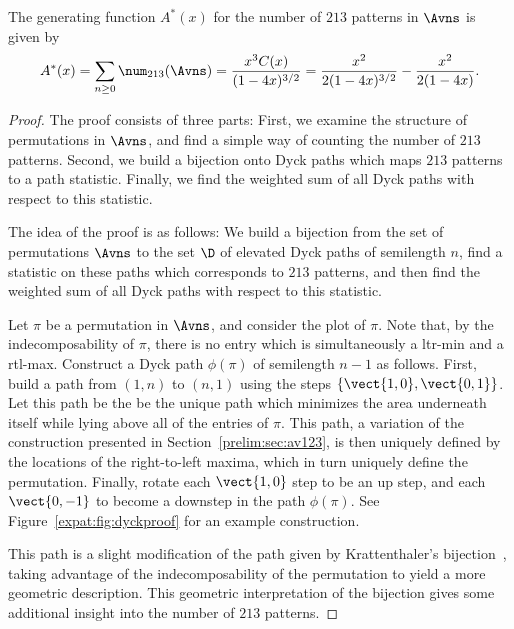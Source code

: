 \documentclass[12pt,twoside]{memoir}
\begin{document}
      \begin{lemma} \label{lemma:213pats}
        The generating function $A^*(x)$ for the number of $213$ patterns in
        $\Avns$ is given by
        $$ A^*(x) = \sum_{n\geq 0} \num_{213}(\Avns) =
        \frac{x^3C(x)}{(1-4x)^{3/2}} = \frac{x^2}{2(1-4x)^{3/2}} -
        \frac{x^2}{2(1-4x)}.$$
      \end{lemma}
      \begin{proof}
        The proof consists of three parts: First, we examine the structure of
        permutations in $\Avns$, and find a simple way of counting the number of
        $213$ patterns. Second, we build a bijection onto Dyck paths which maps
        $213$ patterns to a path statistic. Finally, we find the weighted sum of
        all Dyck paths with respect to this statistic.

        The idea of the proof is as follows: We build a bijection from the set of
        permutations $\Avns$ to the set $\D$ of elevated Dyck paths of semilength
        $n$, find a statistic on these paths which corresponds to $213$ patterns,
        and then find the weighted sum of all Dyck paths with respect to this
        statistic.

        Let $\pi$ be a permutation in $\Avns$, and consider the plot of $\pi$.
        Note that, by the indecomposability of $\pi$, there is no entry which is
        simultaneously a ltr-min and a rtl-max. Construct a Dyck path $\phi(\pi)$
        of semilength $n-1$ as follows. First, build a path from $(1,n)$ to
        $(n,1)$ using the steps $\{\vect{1,0}, \vect{0,1} \}$. Let this path be
        the be the unique path which minimizes the area underneath itself while
        lying above all of the entries of $\pi$. This path, a variation of the
        construction presented in Section~\ref{prelim:sec:av123}, is then
        uniquely defined by the locations of the right-to-left maxima, which in
        turn uniquely define the permutation. Finally, rotate each $\vect{1,0}$
        step to be an up step, and each $\vect{0,-1}$ to become a downstep in
        the path $\phi(\pi)$. See Figure~\ref{expat:fig:dyckproof} for an example
        construction. 
        
        This path is a slight modification of the path given by Krattenthaler's
        bijection~\cite{Krattenthaler2001}, taking advantage of the
        indecomposability of the permutation to yield a more geometric description.
        This geometric interpretation of the bijection gives some additional
        insight into the number of $213$ patterns. 




\end{proof}
\end{document}

